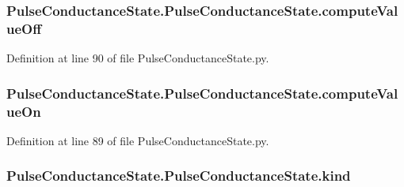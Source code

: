 \subsubsection[{\texorpdfstring{compute\+Value\+Off}{computeValueOff}}]{\setlength{\rightskip}{0pt plus 5cm}Pulse\+Conductance\+State.\+Pulse\+Conductance\+State.\+compute\+Value\+Off}\hypertarget{class_pulse_conductance_state_1_1_pulse_conductance_state_a89e0cc154bd699aee7529574a8fe556c}{}\label{class_pulse_conductance_state_1_1_pulse_conductance_state_a89e0cc154bd699aee7529574a8fe556c}


Definition at line 90 of file Pulse\+Conductance\+State.\+py.

\subsubsection[{\texorpdfstring{compute\+Value\+On}{computeValueOn}}]{\setlength{\rightskip}{0pt plus 5cm}Pulse\+Conductance\+State.\+Pulse\+Conductance\+State.\+compute\+Value\+On}\hypertarget{class_pulse_conductance_state_1_1_pulse_conductance_state_a7f6710b9f97ac5879888402cd5ed15d4}{}\label{class_pulse_conductance_state_1_1_pulse_conductance_state_a7f6710b9f97ac5879888402cd5ed15d4}


Definition at line 89 of file Pulse\+Conductance\+State.\+py.

\subsubsection[{\texorpdfstring{kind}{kind}}]{\setlength{\rightskip}{0pt plus 5cm}Pulse\+Conductance\+State.\+Pulse\+Conductance\+State.\+kind}\hypertarget{class_pulse_conductance_state_1_1_pulse_conductance_state_a53d237daaa4815ad375e2377da89845e}{}\label{class_pulse_conductance_state_1_1_pulse_conductance_state_a53d237daaa4815ad375e2377da89845e}


